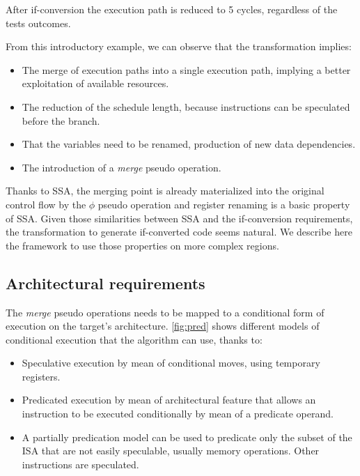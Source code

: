 After if-conversion the execution path is reduced to 5 cycles, regardless of the tests outcomes.

From this introductory example, we can observe that the transformation implies:

\begin{itemize}
\item The merge of execution paths into a single execution path, implying a  better exploitation of available resources.  
\item The reduction of the schedule length, because instructions can be speculated before the branch.
\item That the variables need to be renamed, production of new data dependencies.
\item The introduction of a \textit{merge} pseudo operation.
\end{itemize}

Thanks to SSA, the merging point is already materialized into the original control flow by the $\phi$ pseudo operation and register renaming is a basic property of SSA. Given those similarities between SSA and the if-conversion requirements, the transformation to generate if-converted code seems natural. We describe here the framework to use those properties on more complex regions.

\subsection{Architectural requirements}

The \textit{merge} pseudo operations needs to be mapped to a conditional form of execution on the target's architecture. \ref{fig:pred} shows different models of conditional execution that the algorithm can use, thanks to:

\begin{itemize}
\item Speculative execution by mean of conditional moves, using temporary registers.
\item Predicated execution by mean of architectural feature that allows an instruction to be executed conditionally by mean of a predicate operand.
\item A partially predication model can be used to predicate only the subset of the ISA that are not easily speculable, usually memory operations. Other instructions are speculated.
\end{itemize}

